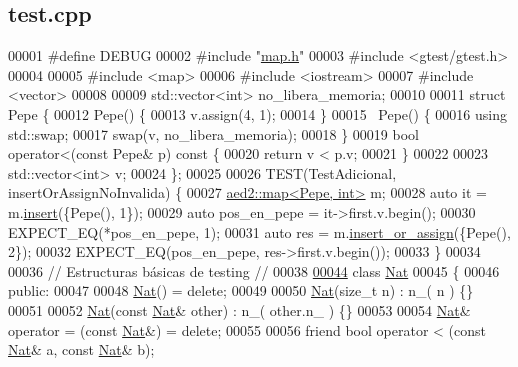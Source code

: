 \hypertarget{test_8cpp_source}{\subsection{test.\-cpp}
}

\begin{DoxyCode}
00001 \textcolor{preprocessor}{#define DEBUG}
00002 \textcolor{preprocessor}{}\textcolor{preprocessor}{#include "\hyperlink{map_8h}{map.h}"}
00003 \textcolor{preprocessor}{#include <gtest/gtest.h>}
00004 
00005 \textcolor{preprocessor}{#include <map>}
00006 \textcolor{preprocessor}{#include <iostream>}
00007 \textcolor{preprocessor}{#include <vector>}
00008 
00009 std::vector<int> no\_libera\_memoria;
00010 
00011 \textcolor{keyword}{struct }Pepe \{
00012     Pepe() \{
00013         v.assign(4, 1);
00014     \}
00015     ~Pepe() \{
00016         \textcolor{keyword}{using} std::swap;
00017         swap(v, no\_libera\_memoria);
00018     \}
00019     \textcolor{keywordtype}{bool} operator<(\textcolor{keyword}{const} Pepe& p)\textcolor{keyword}{ const }\{
00020         \textcolor{keywordflow}{return} v < p.v;
00021     \}
00022     
00023     std::vector<int> v;
00024 \};
00025 
00026 TEST(TestAdicional, insertOrAssignNoInvalida) \{
00027     \hyperlink{classaed2_1_1map}{aed2::map<Pepe, int>} m;
00028     \textcolor{keyword}{auto} it = m.\hyperlink{classaed2_1_1map_a60aacba06b1579630b3c8e996cf248c8_a60aacba06b1579630b3c8e996cf248c8}{insert}(\{Pepe(), 1\});
00029     \textcolor{keyword}{auto} pos\_en\_pepe = it->first.v.begin();
00030     EXPECT\_EQ(*pos\_en\_pepe, 1);
00031     \textcolor{keyword}{auto} res = m.\hyperlink{classaed2_1_1map_a2ef6723c183916276b0afc4a4c721475_a2ef6723c183916276b0afc4a4c721475}{insert_or_assign}(\{Pepe(), 2\});
00032     EXPECT\_EQ(pos\_en\_pepe, res->first.v.begin());
00033 \}
00034 
00036 \textcolor{comment}{// Estructuras básicas de testing //}
00038 \textcolor{comment}{}
\hypertarget{test_8cpp_source_l00044}{}\hyperlink{classNat}{00044} \textcolor{keyword}{class }\hyperlink{classNat}{Nat}
00045 \{
00046     \textcolor{keyword}{public}:
00047 
00048         \hyperlink{classNat}{Nat}() = \textcolor{keyword}{delete};
00049 
00050         \hyperlink{classNat}{Nat}(\textcolor{keywordtype}{size\_t} n) : n\_( n ) \{\}
00051 
00052         \hyperlink{classNat}{Nat}(\textcolor{keyword}{const} \hyperlink{classNat}{Nat}& other) : n\_( other.n\_ ) \{\}
00053 
00054         \hyperlink{classNat}{Nat}& operator = (\textcolor{keyword}{const} \hyperlink{classNat}{Nat}&) = \textcolor{keyword}{delete};
00055 
00056         \textcolor{keyword}{friend} \textcolor{keywordtype}{bool} operator < (\textcolor{keyword}{const} \hyperlink{classNat}{Nat}& a, \textcolor{keyword}{const} \hyperlink{classNat}{Nat}& b);

\end{DoxyCode}
